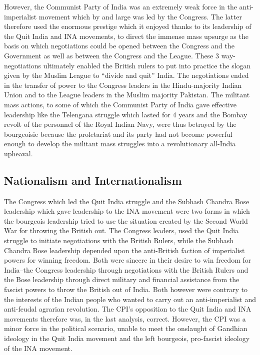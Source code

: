 However, the Communist Party of India was an extremely weak force in the anti-imperialist movement which by and large was led by the Congress. The latter therefore used the enormous prestige which it enjoyed thanks to its leadership of the Quit India and INA movements, to direct the immense mass upsurge as the basis on which negotiations could be opened between the Congress and the Government as well as between the Congress and the League. These 3 way-negotiations ultimately enabled the British rulers to put into practice the slogan given by the Muslim League to “divide and quit” India. The negotiations ended in the transfer of power to the Congress leaders in the Hindu-majority Indian Union and to 
the League leaders in the Muslim majority Pakistan. The militant mass actions, to some of which the Communist Party of India gave effective leadership like the Telengana struggle which lasted for 4 years and the Bombay revolt of the personnel of the Royal Indian Navy, were thus betrayed by the bourgeoisie because the proletariat and its party had not become powerful enough to develop the militant mass struggles into a revolutionary all-India upheaval. 

\subsection{Nationalism and Internationalism }

The Congress which led the Quit India struggle and the Subhash Chandra Bose leadership which gave leadership to the INA movement were two forms in which the bourgeois leadership tried to use the situation created by the Second World War for throwing the British out. The Congress leaders, used the Quit India struggle to initiate negotiations with the British Rulers, while the Subhash Chandra Bose leadership depended upon the anti-British faction of imperialist powers for winning freedom. Both were sincere in their desire to win freedom for India--the Congress leadership through negotiations with the British Rulers and the Bose leadership through direct military and financial assistance from the fascist powers to throw the British out of India. Both however were contrary to the interests of the Indian people who wanted to carry out an anti-imperialist and anti-feudal agrarian revolution. The CPI’s opposition to the Quit India and INA movements therefore was, in the last analysis, correct. However, the CPI was a minor force in the political scenario, unable to meet the onslaught of Gandhian ideology in the Quit India movement and the left bourgeois, pro-fascist ideology of the INA movement. 

